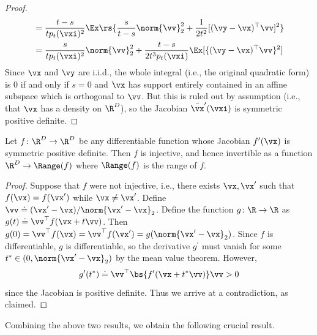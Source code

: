 \documentclass[../../book-main.tex]{subfiles}
\begin{document}
\begin{proof}
\begin{align}
        &= \frac{t - s}{tp_{t}(\vxi)^{2}}\Ex\rs{\frac{s}{t -
        s}\norm{\vv}_{2}^{2} +\frac{1}{2t^{2}}[(\vy - \vx)^{\top}\vv]^{2}} \\
        &= \frac{s}{tp_{t}(\vxi)^{2}}\norm{\vv}_{2}^{2} + \frac{t -
        s}{2t^{3}p_{t}(\vxi)}\Ex[\{(\vy - \vx)^{\top}\vv\}^{2}]
    \end{align}
    Since \(\vx\) and \(\vy\) are i.i.d., the whole integral (i.e.,
    the original quadratic form) is \(0\) if and only if \(s = 0\)
    and \(\vx\) has support entirely contained in an affine subspace
    which is orthogonal to \(\vv\). But this is ruled out by
    assumption (i.e., that \(\vx\) has a density on \(\R^{D}\)), so
    the Jacobian \(\bar{\vx}^{\prime}(\vxi)\) is symmetric positive definite.
\end{proof}

\begin{lemma}\label{lem:gribonval_A2}
    Let \(f \colon \R^{D} \to \R^{D}\) be any differentiable function
    whose Jacobian \(f^{\prime}(\vx)\) is symmetric positive
    definite. Then \(f\) is injective, and hence invertible as a
    function \(\R^{D} \to \Range(f)\) where \(\Range(f)\) is the range of \(f\).
\end{lemma}
\begin{proof}
    Suppose that \(f\) were not injective, i.e., there exists \(\vx,
    \vx^{\prime}\) such that \(f(\vx) = f(\vx^{\prime})\) while \(\vx
    \neq \vx^{\prime}\). Define \(\vv \doteq (\vx^{\prime} -
    \vx)/\norm{\vx^{\prime} - \vx}_{2}\). Define the function \(g
    \colon \R \to \R\) as \(g(t) \doteq \vv^{\top}f(\vx + t\vv)\).
    Then \(g(0) = \vv^{\top}f(\vx) = \vv^{\top}f(\vx^{\prime}) =
    g(\norm{\vx^{\prime} - \vx}_{2})\). Since \(f\) is
    differentiable, \(g\) is differentiable, so the derivative
    \(g^{\prime}\) must vanish for some \(t^{\ast} \in (0,
    \norm{\vx^{\prime} - \vx}_{2})\) by the mean value theorem. However,
    \begin{equation}
        g^{\prime}(t^{\ast}) \doteq \vv^{\top}\bs{f^{\prime}(\vx +
        t^{\ast}\vv)}\vv > 0
    \end{equation}
    since the Jacobian is positive definite. Thus we arrive at a
    contradiction, as claimed.
\end{proof}

Combining the above two results, we obtain the following crucial result.
\end{document}
